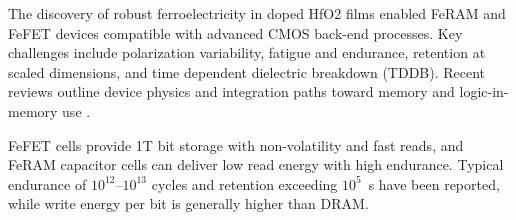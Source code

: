 The discovery of robust ferroelectricity in doped HfO2 films \cite{boscke2011,mueller2012} enabled FeRAM and FeFET devices compatible with advanced CMOS back-end processes. Key challenges include polarization variability, fatigue and endurance, retention at scaled dimensions, and time dependent dielectric breakdown (TDDB). Recent reviews outline device physics and integration paths toward memory and logic-in-memory use \cite{noheda2023}.

FeFET cells provide 1T bit storage with non-volatility and fast reads, and FeRAM capacitor cells can deliver low read energy with high endurance. Typical endurance of \mbox{$10^{12}$--$10^{13}$} cycles and retention exceeding \mbox{$10^{5}$ s} have been reported, while write energy per bit is generally higher than DRAM.
